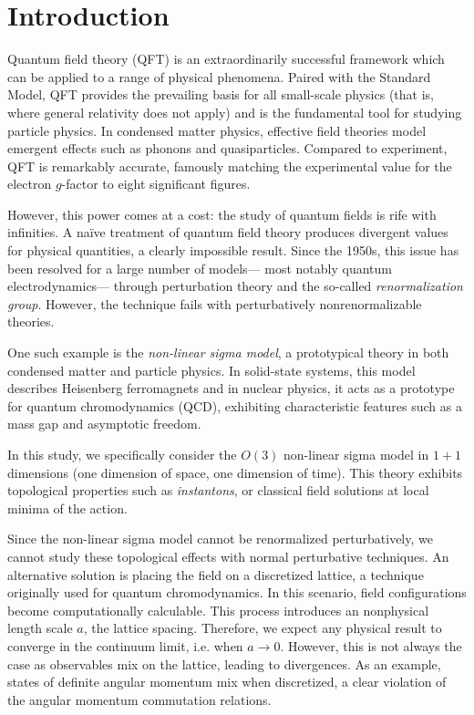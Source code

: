\documentclass[12pt]{report}
\newcommand{\citeneeded}{}
\begin{document}
\chapter{Introduction}

Quantum field theory (QFT) is an extraordinarily successful framework which can be applied to a range of physical phenomena. Paired with the Standard Model, QFT provides the prevailing basis for all small-scale physics (that is, where general relativity does not apply) and is the fundamental tool for studying particle physics. In condensed matter physics, effective field theories model emergent effects such as phonons and quasiparticles. Compared to experiment, QFT is remarkably accurate, famously matching the experimental value for the electron $g$-factor to eight significant figures.\cite{weisskopf1981} 

However, this power comes at a cost: the study of quantum fields is rife with infinities. A na\"ive treatment of quantum field theory produces divergent values for physical quantities, a clearly impossible result. Since the 1950s, this issue has been resolved for a large number of models--- most notably quantum electrodynamics--- through perturbation theory and the so-called \textit{renormalization group}. However, the technique fails with perturbatively nonrenormalizable theories. 

One such example is the \textit{non-linear sigma model}, a prototypical theory in both condensed matter and particle physics. In solid-state systems, this model describes Heisenberg ferromagnets and in nuclear physics, it acts as a prototype for quantum chromodynamics (QCD), exhibiting characteristic features such as a mass gap and asymptotic freedom. \citeneeded

In this study, we specifically consider the $O(3)$ non-linear sigma model in $1+1$ dimensions (one dimension of space, one dimension of time). This theory exhibits topological properties such as \textit{instantons}, or classical field solutions at local minima of the action.

Since the non-linear sigma model cannot be renormalized perturbatively, we cannot study these topological effects with normal perturbative techniques. An alternative solution is placing the field on a discretized lattice, a technique originally used for quantum chromodynamics. In this scenario, field configurations become computationally calculable. This process introduces an nonphysical length scale $a$, the lattice spacing. Therefore, we expect any physical result to converge in the continuum limit, i.e. when $a\rightarrow 0$. However, this is not always the case as observables mix on the lattice, leading to divergences. As an example, states of definite angular momentum mix when discretized, a clear violation of the angular momentum commutation relations. 
\end{document}
